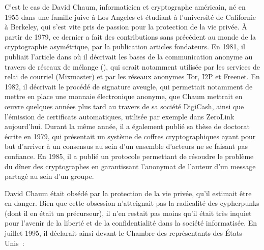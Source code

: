 C'est le cas de David Chaum, informaticien et cryptographe américain, né en 1955 dans une famille juive à Los Angeles et étudiant à l'université de Californie à Berkeley, qui s'est vite pris de passion pour la protection de la vie privée. À partir de 1979, ce dernier a fait des contributions sans précédent au monde de la cryptographie asymétrique, par la publication articles fondateurs. En 1981, il publiait l'article  dans  où il décrivait les bases de la communication anonyme au travers de réseaux de mélange (), qui serait notamment utilisée par les services de relai de courriel (Mixmaster) et par les réseaux anonymes Tor, I2P et Freenet. En 1982, il décrivait le procédé de signature aveugle, qui permettait notamment de mettre en place une monnaie électronique anonyme, que Chaum mettrait en œuvre quelques années plus tard au travers de sa société DigiCash, ainsi que l'émission de certificats automatiques, utilisée par exemple dans ZeroLink aujourd'hui. Durant la même année, il a également publié sa thèse de doctorat écrite en 1979, qui présentait un système de coffres cryptographiques ayant pour but d'arriver à un consensus au sein d'un ensemble d'acteurs ne se faisant pas confiance. En 1985, il a publié un protocole permettant de résoudre le problème du dîner des cryptographes en garantissant l'anonymat de l'auteur d'un message partagé au sein d'un groupe. %

David Chaum était obsédé par la protection de la vie privée, qu'il estimait être en danger. Bien que cette obsession n'atteignait pas la radicalité des cypherpunks (dont il en était un précurseur), il n'en restait pas moins qu'il était très inquiet pour l'avenir de la liberté et de la confidentialité dans la société informatisée. En juillet 1995, il déclarait ainsi devant le Chambre des représentants des États-Unis~:


